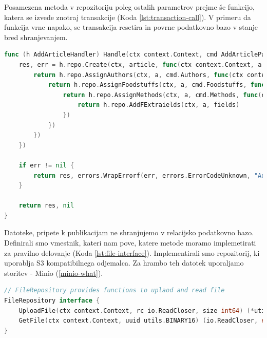 \documentclass[a4paper, 12pt]{book}
\begin{document}
Posamezena metoda v repozitoriju poleg ostalih parametrov prejme še funkcijo, katera se izvede znotraj transakcije (Koda \ref{lst:transaction-call}). V primeru da funkcija vrne napako, se transakcija resetira in povrne podatkovno bazo v stanje bred shranjevanjem.

\begin{lstlisting}[language=go,style=mystyle,caption={ Prikaz shranjevanja publikacije },label=lst:transaction-call]
func (h AddArticleHandler) Handle(ctx context.Context, cmd AddArticleParamsCmd) (res *domain.Article, err error) {
	res, err = h.repo.Create(ctx, article, func(ctx context.Context, a *domain.Article) error {
		return h.repo.AssignAuthors(ctx, a, cmd.Authors, func(ctx context.Context, a *domain.Article) error {
			return h.repo.AssignFoodstuffs(ctx, a, cmd.Foodstuffs, func(ctx context.Context, a *domain.Article) error {
				return h.repo.AssignMethods(ctx, a, cmd.Methods, func(ctx context.Context, a *domain.Article) error {
					return h.repo.AddFExtraields(ctx, a, fields)
				})
			})
		})
	})
	
	if err != nil {
		return res, errors.WrapErrorf(err, errors.ErrorCodeUnknown, "AddArticleHandler.repo")
	}
	
	return res, nil
}
\end{lstlisting}

Datoteke, pripete k publikacijam ne shranjujemo v relacijsko podatkovno bazo. Definirali smo vmestnik, kateri nam pove, katere metode moramo implemetirati za pravilno delovanje (Koda \ref{lst:file-interface}). Implementirali smo repozitorij, ki uporablja S3 kompatibilnega odjemalca. Za hrambo teh datotek uporaljamo storitev - Minio (\ref{minio-what}).

\begin{lstlisting}[language=go,style=mystyle,caption={Prikaz vmestnika za shranjevanje in branje datotek},label=lst:file-interface]
// FileRepository provides functions to uplaod and read file
FileRepository interface {
	UploadFile(ctx context.Context, rc io.ReadCloser, size int64) (*utils.BINARY16, error)
	GetFile(ctx context.Context, uuid utils.BINARY16) (io.ReadCloser, error)
}
\end{lstlisting}
\end{document}
